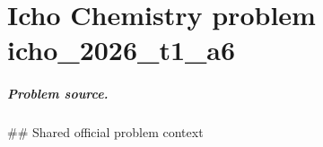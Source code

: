 
\chapter{Icho Chemistry problem icho\_2026\_t1\_a6}
\label{ch:IChO2026Problems_problem_icho_2026_t1_a6}

\paragraph{Problem source.}
\#\# Shared official problem context
